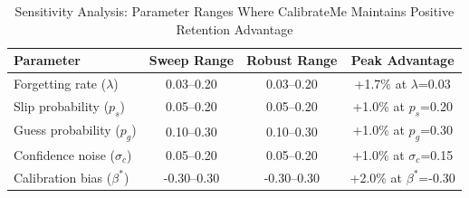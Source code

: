 \begin{table}[t]
\centering
\scriptsize
\setlength{\tabcolsep}{3pt}
\caption{Sensitivity Analysis: Parameter Ranges Where CalibrateMe Maintains Positive Retention Advantage}
\label{tab:sensitivity}
\begin{tabular}{lccc}
\toprule
\textbf{Parameter} & \textbf{Sweep Range} & \textbf{Robust Range} & \textbf{Peak Advantage} \\
\midrule
Forgetting rate ($\lambda$) & 0.03--0.20 & 0.03--0.20 & +1.7\% at $\lambda$=0.03 \\
Slip probability ($p_s$) & 0.05--0.20 & 0.05--0.20 & +1.0\% at $p_s$=0.20 \\
Guess probability ($p_g$) & 0.10--0.30 & 0.10--0.30 & +1.0\% at $p_g$=0.30 \\
Confidence noise ($\sigma_c$) & 0.05--0.20 & 0.05--0.20 & +1.0\% at $\sigma_c$=0.15 \\
Calibration bias ($\beta^*$) & -0.30--0.30 & -0.30--0.30 & +2.0\% at $\beta^*$=-0.30 \\
\bottomrule
\end{tabular}
\end{table}
